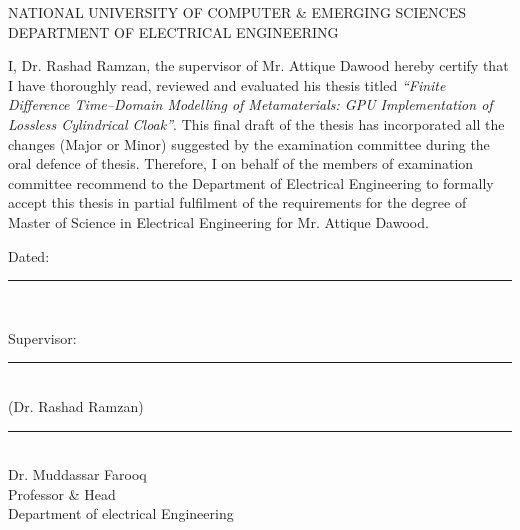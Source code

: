 \begin{center}
{NATIONAL UNIVERSITY OF COMPUTER \& EMERGING SCIENCES\\DEPARTMENT OF ELECTRICAL ENGINEERING}\\[0.5cm]
\end{center}

I, Dr. Rashad Ramzan, the supervisor of Mr. Attique Dawood hereby certify that I have thoroughly read, reviewed and evaluated his thesis titled \emph{``Finite Difference Time--Domain Modelling of Metamaterials: GPU Implementation of Lossless Cylindrical Cloak''}. This final draft of the thesis has incorporated all the changes (Major or Minor) suggested by the examination committee during the oral defence of thesis. Therefore, I on behalf of the members of examination committee recommend to the Department of Electrical Engineering to formally accept this thesis in partial fulfilment of the requirements for the degree of Master of Science in Electrical Engineering for Mr. Attique Dawood.\\[0.1cm]
\begin{flushright}
Dated:~\rule{3cm}{0.2mm}\\[2cm]
\end{flushright}
\begin{center}
Supervisor:~\rule{5cm}{0.2mm}\\
\hspace{1.8cm}
(Dr. Rashad Ramzan)\\[3cm]
\rule{5cm}{0.2mm}\\
Dr. Muddassar Farooq\\
Professor \& Head\\
Department of electrical Engineering
\end{center}